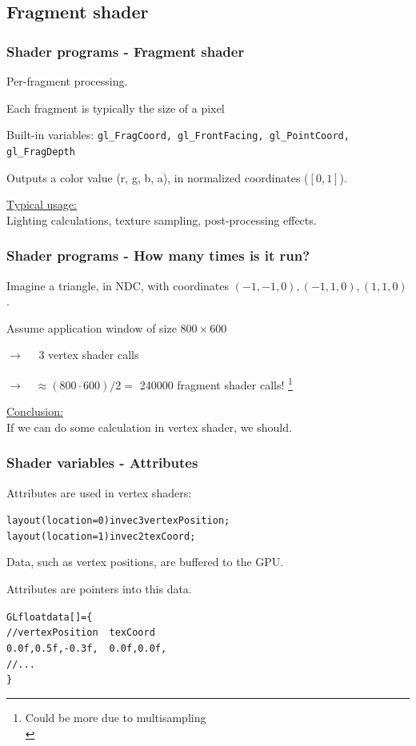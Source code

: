 \documentclass{beamer}
\begin{document}
\subsection{Fragment shader}
\begin{frame}
\frametitle{Shader programs - Fragment shader}
Per-fragment processing.

Each fragment is typically the size of a pixel

Built-in variables: \texttt{gl\_FragCoord, gl\_FrontFacing, gl\_PointCoord,
gl\_FragDepth}

Outputs a color value (r, g, b, a), in normalized coordinates ($[0, 1]$).

\vspace{5mm}
\underline{Typical usage:}\\\vspace{1mm}
Lighting calculations, texture sampling, post-processing effects.
\end{frame}


%
%
%
\begin{frame}
\frametitle{Shader programs - How many times is it run?}

Imagine a triangle, in NDC, with coordinates $(-1,-1,0), (-1,1,0), (1,1,0)$.

Assume application window of size $800 \times 600$

$\rightarrow \quad$ 3 vertex shader calls

$\rightarrow \quad \approx (800\cdot 600) / 2 = $ 240000 fragment shader calls!
\footnote{Could be more due to multisampling\\}\\\vspace{5mm}

\underline{Conclusion:}\\\vspace{1mm}
If we can do some calculation in vertex shader, we should.
\end{frame}


%
%
%
\begin{frame}
\frametitle{Shader variables - Attributes}

Attributes are used in vertex shaders:

\begin{alltt}\footnotesize
layout (location = 0) in vec3 vertexPosition;\\
layout (location = 1) in vec2 texCoord;
\end{alltt}

Data, such as vertex positions, are buffered to the GPU.

Attributes are pointers into this data.

\begin{alltt}
GLfloat data[] = \{\\
    // vertexPosition \ensuremath{\quad} texCoord\\
    0.0f, 0.5f, -0.3f,\ensuremath{\quad}    0.0f, 0.0f,\\
    //  ...\\
\}
\end{alltt}

\end{frame}
\end{document}
